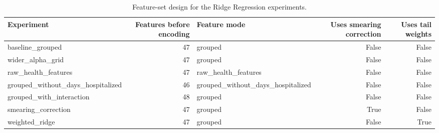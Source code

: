 \begin{table}
\caption{Feature-set design for the Ridge Regression experiments.}
\label{tab:04-ridge-feature-set-summary}
\begin{tabular}{lrlrr}
\toprule
Experiment & Features before encoding & Feature mode & Uses smearing correction & Uses tail weights \\
\midrule
baseline_grouped & 47 & grouped & False & False \\
wider_alpha_grid & 47 & grouped & False & False \\
raw_health_features & 47 & raw_health_features & False & False \\
grouped_without_days_hospitalized & 46 & grouped_without_days_hospitalized & False & False \\
grouped_with_interaction & 48 & grouped & False & False \\
smearing_correction & 47 & grouped & True & False \\
weighted_ridge & 47 & grouped & False & True \\
\bottomrule
\end{tabular}
\end{table}
